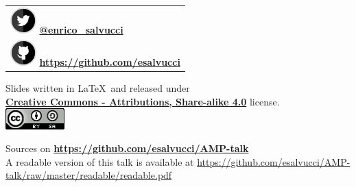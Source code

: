 \documentclass[graphic, aspectratio=169]{beamer}
\begin{document}
\begin{frame}
\begin{center}
\begin{tabular}{>{\centering\arraybackslash}p{4cm}}
\includegraphics[height=1cm]{images/twitter_logo.png} \textbf{\href{https://twitter.com/enrico_salvucci}{ @enrico\_salvucci}} \\
\includegraphics[height=1cm]{images/github_logo.png} \textbf{\href{https://github.com/esalvucci}{https://github.com/esalvucci}} \\
\end{tabular}

\bigskip
\begin{footnotesize}
Slides written in \LaTeX\ and released under \\ \textbf{\href{http://creativecommons.org/licenses/by-sa/4.0/}{Creative Commons - Attributions, Share-alike 4.0}} license.\\

\medskip
\includegraphics[height=0.8cm]{images/cc.png}

\medskip
Sources on \textbf{\url{https://github.com/esalvucci/AMP-talk}}\\
A readable version of this talk is available at \url{ https://github.com/esalvucci/AMP-talk/raw/master/readable/readable.pdf} 
\end{footnotesize}
\end{center}
\end{frame}
\end{document}
